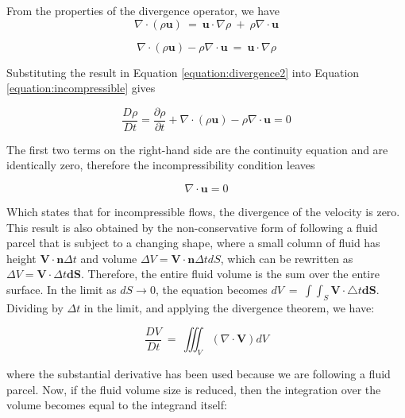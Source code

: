 \documentclass[journal]{new-aiaa}
\begin{document}
From the properties of the divergence operator, we have
\begin{equation}
\label{equation:divergence}
\nabla \cdot (\rho \textbf{u})\  =\ \textbf{u}\cdot \nabla \rho \  +\  \rho \nabla \cdot \textbf{u}
\end{equation}


\begin{equation}
\label{equation:divergence2}
\nabla \cdot (\rho \textbf{u})- \rho \nabla \cdot \textbf{u}\  =\ \textbf{u}\cdot \nabla \rho 
\end{equation}

Substituting the result in Equation \ref{equation:divergence2} into Equation \ref{equation:incompressible} gives

\begin{equation}
\label{equation:incompressible2}
\frac{D\rho }{Dt} =\frac{\partial \rho }{\partial t} +\nabla \cdot (\rho \textbf{u})-\rho \nabla \cdot \textbf{u}=0
\end{equation}

The first two terms on the right-hand side are the continuity equation and are identically zero, therefore the incompressibility condition leaves

\begin{equation}
\label{equation:incompressible3}
\nabla \cdot \textbf{u}=0
\end{equation}

Which states that for incompressible flows, the divergence of the velocity is zero. This result is also obtained by the non-conservative form of following a fluid parcel that is subject to a changing shape, where a small column of fluid has height $\textbf{V}\cdot \textbf{n}\Delta t$ and volume $\Delta V = \textbf{V}\cdot \textbf{n}\Delta t dS$, which can be rewritten as $\Delta V = \textbf{V}\cdot \Delta t \textbf{dS}$. Therefore, the entire fluid volume is the sum over the entire surface. In the limit as $dS\rightarrow 0$, the equation becomes $dV\  =\  \int \int_{S} \textbf{V}\cdot \bigtriangleup t\textbf{dS}$. Dividing by $\Delta t$ in the limit, and applying the divergence theorem, we have:

\begin{equation}
\label{equation:incompressible4}
\frac{DV}{Dt} \  =\  \iiint_{V} (\nabla \cdot \textbf{V})dV
\end{equation}

where the substantial derivative has been used because we are following a fluid parcel. Now, if the fluid volume size is reduced, then the integration over the volume becomes equal to the integrand itself:
\end{document}
